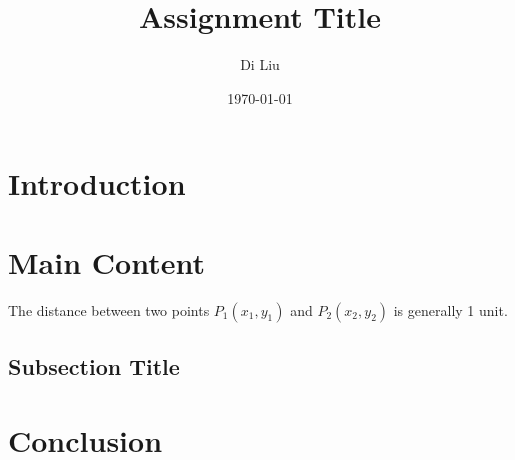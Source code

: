 \documentclass[12pt]{article}
\title{Assignment Title}
\author{Di Liu}
\date{\today}
\begin{document}
\maketitle

\section{Introduction}

\section{Main Content}
The distance between two points $P_1(x_1, y_1)$ and $P_2(x_2, y_2)$ is
generally 1 unit.

\subsection{Subsection Title}

\section{Conclusion}

%
%
\end{document}
